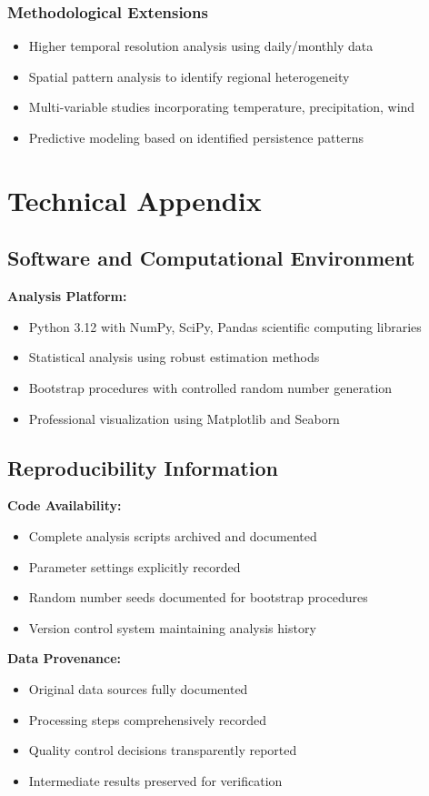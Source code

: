 \documentclass[12pt,a4paper]{article}
\begin{document}
\subsubsection{Methodological Extensions}
\begin{itemize}
    \item Higher temporal resolution analysis using daily/monthly data
    \item Spatial pattern analysis to identify regional heterogeneity
    \item Multi-variable studies incorporating temperature, precipitation, wind
    \item Predictive modeling based on identified persistence patterns
\end{itemize}

\section{Technical Appendix}

\subsection{Software and Computational Environment}

\textbf{Analysis Platform:}
\begin{itemize}
    \item Python 3.12 with NumPy, SciPy, Pandas scientific computing libraries
    \item Statistical analysis using robust estimation methods
    \item Bootstrap procedures with controlled random number generation
    \item Professional visualization using Matplotlib and Seaborn
\end{itemize}

\subsection{Reproducibility Information}

\textbf{Code Availability:}
\begin{itemize}
    \item Complete analysis scripts archived and documented
    \item Parameter settings explicitly recorded
    \item Random number seeds documented for bootstrap procedures
    \item Version control system maintaining analysis history
\end{itemize}

\textbf{Data Provenance:}
\begin{itemize}
    \item Original data sources fully documented
    \item Processing steps comprehensively recorded
    \item Quality control decisions transparently reported
    \item Intermediate results preserved for verification
\end{itemize}



\end{document}
